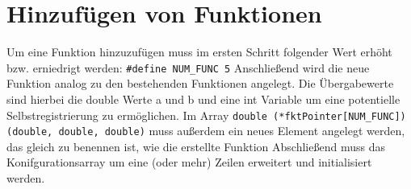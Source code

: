 \section{Hinzufügen von Funktionen}
Um eine Funktion hinzuzufügen muss im ersten Schritt folgender Wert erhöht bzw. erniedrigt werden:
\newline\texttt{#define NUM_FUNC 5}
\newline
Anschließend wird die neue Funktion analog zu den bestehenden Funktionen angelegt. Die Übergabewerte sind hierbei die double Werte a und b und eine int Variable um eine potentielle Selbstregistrierung zu ermöglichen. Im Array \texttt{double (*fktPointer[NUM_FUNC])(double, double, double)} muss außerdem ein neues Element angelegt werden, das gleich zu benennen ist, wie die erstellte Funktion
Abschließend muss das Konifgurationsarray um eine (oder mehr) Zeilen erweitert und initialisiert werden. 

